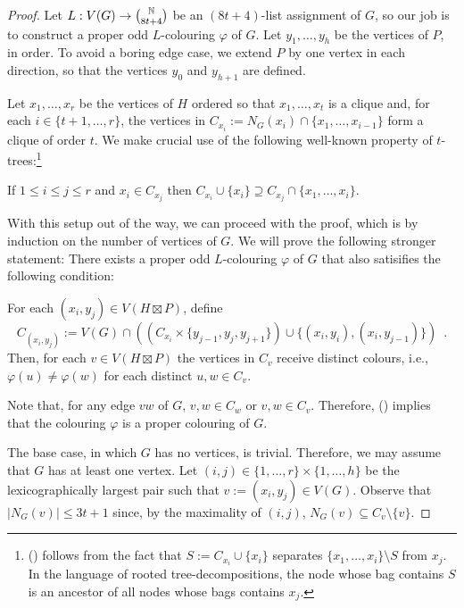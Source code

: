 \documentclass{patmorin}
\begin{document}
\begin{proof}
  Let $L:V(G)\to\binom{\mathbb{N}}{8t+4}$ be an $(8t+4)$-list assignment of $G$, so our job is to construct a proper odd $L$-colouring $\varphi$ of $G$.  Let $y_1,\ldots,y_h$ be the vertices of $P$, in order.  To avoid a boring edge case, we extend $P$ by one vertex in each direction, so that the vertices $y_0$ and $y_{h+1}$ are defined.

  Let $x_1,\ldots,x_r$ be the vertices of $H$ ordered so that $x_1,\ldots,x_{t}$ is a clique and, for each $i\in\{t+1,\ldots,r\}$, the vertices in $C_{x_i}:=N_G(x_i)\cap\{x_1,\ldots,x_{i-1}\}$ form a clique of order $t$.  We make crucial use of the following well-known property of $t$-trees:\footnote{() follows from the fact that $S:=C_{x_i}\cup\{x_i\}$ separates $\{x_1,\ldots,x_i\}\setminus S$ from $x_{j}$.  In the language of rooted tree-decompositions, the node whose bag contains $S$ is an ancestor of all nodes whose bags contains $x_{j}$.}
  \begin{compactitem}[(\ding{74})]
    \item If $1\le i \le j\le r$ and $x_i \in C_{x_{j}}$ then $C_{x_i}\cup\{x_i\}\supseteq C_{x_{j}}\cap\{x_1,\ldots,x_{i}\}$.
  \end{compactitem}

  With this setup out of the way, we can proceed with the proof, which is by induction on the number of vertices of $G$.  We will prove the following stronger statement:  There exists a proper odd $L$-colouring $\varphi$ of $G$ that also satisifies the following condition:
  \begin{compactitem}[(\ding{96})]
    \item For each $(x_i,y_j)\in V(H\boxtimes P)$, define
    \[
      C_{(x_i,y_j)}:=V(G)\cap \left(\left(C_{x_i}\times\{y_{j-1}, y_{j},y_{j+1}\}\right)\cup\{(x_i,y_i),(x_i,y_{j-1})\}\right)
      \enspace .
    \]
    Then, for each $v\in V(H\boxtimes P)$ the vertices in $C_v$ receive distinct colours, i.e., $\varphi(u)\neq \varphi(w)$ for each distinct $u,w\in C_v$.
  \end{compactitem}
  Note that, for any edge $vw$ of $G$, $v,w \in C_w$ or $v,w\in C_v$.  Therefore, () implies that the colouring $\varphi$ is a proper colouring of $G$.

  The base case, in which $G$ has no vertices, is trivial. Therefore, we may assume that $G$ has at least one vertex.  Let $(i,j)\in\{1,\ldots,r\}\times\{1,\ldots,h\}$ be the lexicographically largest pair such that $v:=(x_i,y_j)\in V(G)$.  Observe that $|N_G(v)|\le 3t+1$ since, by the maximality of $(i,j)$,  $N_G(v)\subseteq C_v\setminus\{v\}$.


\end{proof}
\end{document}
